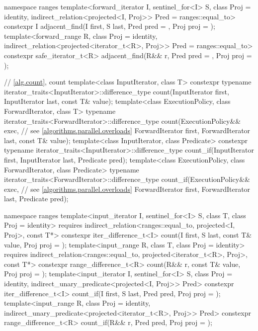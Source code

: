 \begin{codeblock}
{  namespace ranges {
    template<forward_iterator I, sentinel_for<I> S, class Proj = identity,
             indirect_relation<projected<I, Proj>> Pred = ranges::equal_to>
      constexpr I adjacent_find(I first, S last, Pred pred = {},
                                Proj proj = {});
    template<forward_range R, class Proj = identity,
             indirect_relation<projected<iterator_t<R>, Proj>> Pred = ranges::equal_to>
      constexpr safe_iterator_t<R>
        adjacent_find(R&& r, Pred pred = {}, Proj proj = {});
  }

  // \ref{alg.count}, count
  template<class InputIterator, class T>
    constexpr typename iterator_traits<InputIterator>::difference_type
      count(InputIterator first, InputIterator last, const T& value);
  template<class ExecutionPolicy, class ForwardIterator, class T>
    typename iterator_traits<ForwardIterator>::difference_type
      count(ExecutionPolicy&& exec,                             // see \ref{algorithms.parallel.overloads}
            ForwardIterator first, ForwardIterator last, const T& value);
  template<class InputIterator, class Predicate>
    constexpr typename iterator_traits<InputIterator>::difference_type
      count_if(InputIterator first, InputIterator last, Predicate pred);
  template<class ExecutionPolicy, class ForwardIterator, class Predicate>
    typename iterator_traits<ForwardIterator>::difference_type
      count_if(ExecutionPolicy&& exec,                          // see \ref{algorithms.parallel.overloads}
               ForwardIterator first, ForwardIterator last, Predicate pred);

  namespace ranges {
    template<input_iterator I, sentinel_for<I> S, class T, class Proj = identity>
      requires indirect_relation<ranges::equal_to, projected<I, Proj>, const T*>
      constexpr iter_difference_t<I>
        count(I first, S last, const T& value, Proj proj = {});
    template<input_range R, class T, class Proj = identity>
      requires indirect_relation<ranges::equal_to, projected<iterator_t<R>, Proj>, const T*>
      constexpr range_difference_t<R>
        count(R&& r, const T& value, Proj proj = {});
    template<input_iterator I, sentinel_for<I> S, class Proj = identity,
             indirect_unary_predicate<projected<I, Proj>> Pred>
      constexpr iter_difference_t<I>
        count_if(I first, S last, Pred pred, Proj proj = {});
    template<input_range R, class Proj = identity,
             indirect_unary_predicate<projected<iterator_t<R>, Proj>> Pred>
      constexpr range_difference_t<R>
        count_if(R&& r, Pred pred, Proj proj = {});
  }

}
\end{codeblock}
